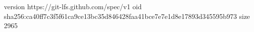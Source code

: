 version https://git-lfs.github.com/spec/v1
oid sha256:ca40ff7c3f5f61ca9ce13bc35d846428faa41bce7e7e1d8e17893d345595b973
size 2965
